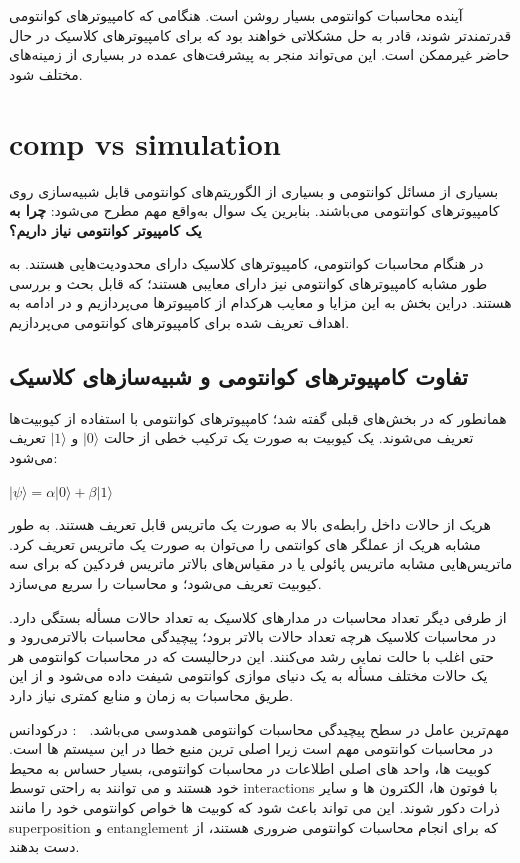 \documentclass{book}
\begin{document}
آینده محاسبات کوانتومی بسیار روشن است. هنگامی که کامپیوترهای کوانتومی قدرتمندتر شوند، قادر به حل مشکلاتی خواهند بود که برای کامپیوترهای کلاسیک در حال حاضر غیرممکن است. این می‌تواند منجر به پیشرفت‌های عمده در بسیاری از زمینه‌های مختلف شود.
\section{comp vs simulation}

بسیاری از مسائل کوانتومی و بسیاری از الگوریتم‌های کوانتومی قابل شبیه‌سازی روی کامپیوتر‌های کوانتومی می‌باشند. بنابرین یک سوال به‌واقع مهم مطرح می‌شود: \textbf{چرا به یک کامپیوتر کوانتومی نیاز داریم؟}

در هنگام محاسبات کوانتومی،‌ کامپیوتر‌های کلاسیک دارای محدودیت‌هایی هستند. به طور مشابه کامپیوتر‌های کوانتومی نیز دارای معایبی هستند؛ که قابل بحث و بررسی هستند. دراین بخش به این مزایا و معایب هرکدام از کامپیوترها می‌پردازیم و در ادامه به اهداف تعریف شده برای کامپیوترهای کوانتومی می‌پردازیم.


\subsection{تفاوت کامپیوترهای کوانتومی و شبیه‌سازهای کلاسیک}
همانطور که در بخش‌های قبلی گفته شد؛ کامپیوترهای کوانتومی با استفاده از کیوبیت‌ها تعریف می‌شوند. یک کیوبیت به صورت یک ترکیب خطی از حالت $\vert0\rangle$ و $\vert1\rangle$ تعریف می‌شود:

\begin{center}
	$\vert\psi\rangle = \alpha\vert0\rangle + \beta\vert1\rangle$
\end{center}

هریک از حالات داخل رابطه‌ی بالا به صورت یک ماتریس قابل تعریف هستند. به طور مشابه هریک از عملگر های کوانتمی را می‌توان به صورت یک ماتریس تعریف کرد. ماتریس‌هایی مشابه ماتریس پائولی یا در مقیاس‌های بالاتر ماتریس فردکین که برای سه کیوبیت تعریف می‌شود؛ و محاسبات را سریع می‌سازد.



از طرفی دیگر تعداد محاسبات در مدار‌های کلاسیک به تعداد حالات مسأله بستگی دارد. در محاسبات کلاسیک هرچه تعداد حالات بالاتر برود؛ پیچیدگی محاسبات بالاتر‌می‌رود و حتی اغلب با حالت نمایی رشد می‌کنند. این درحالیست که در محاسبات کوانتومی هر یک حالات مختلف مسأله به یک دنیای موازی کوانتومی شیفت داده می‌شود و از این طریق محاسبات به زمان و منابع کمتری نیاز دارد.


مهم‌ترین عامل در سطح پیچیدگی محاسبات کوانتومی همدوسی می‌باشد. 
🤖 : درکودانس در محاسبات کوانتومی مهم است زیرا اصلی ترین منبع خطا در این سیستم ها است. کوبیت ها، واحد های اصلی اطلاعات در محاسبات کوانتومی، بسیار حساس به محیط خود هستند و می توانند به راحتی توسط  interactions با فوتون ها، الکترون ها و سایر ذرات دکور شوند. این می تواند باعث شود که کوبیت ها خواص کوانتومی خود را مانند superposition و entanglement که برای انجام محاسبات کوانتومی ضروری هستند، از دست بدهند.
\end{document}
